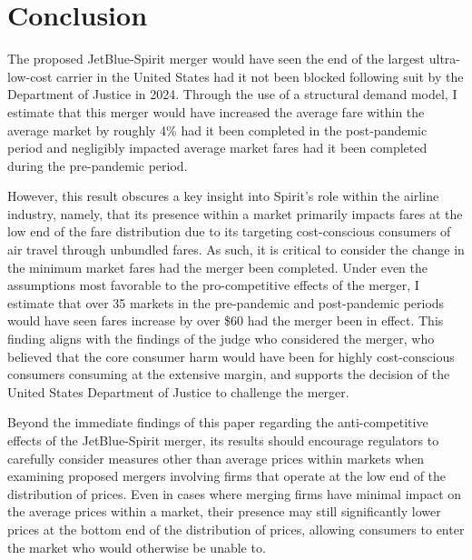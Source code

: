 \documentclass{article}
\begin{document}
    
	\section{Conclusion}
	\label{sec:Conclusion}
    The proposed JetBlue-Spirit merger would have seen the end of the largest ultra-low-cost carrier in the United States had it not been blocked following suit by the Department of Justice in 2024. Through the use of a structural demand model, I estimate that this merger would have increased the average fare within the average market by roughly 4\% had it been completed in the post-pandemic period and negligibly impacted average market fares had it been completed during the pre-pandemic period.

    However, this result obscures a key insight into Spirit's role within the airline industry, namely, that its presence within a market primarily impacts fares at the low end of the fare distribution due to its targeting cost-conscious consumers of air travel through unbundled fares. As such, it is critical to consider the change in the minimum market fares had the merger been completed. Under even the assumptions most favorable to the pro-competitive effects of the merger, I estimate that over 35 markets in the pre-pandemic and post-pandemic periods would have seen fares increase by over \$60 had the merger been in effect. This finding aligns with the findings of the judge who considered the merger, who believed that the core consumer harm would have been for highly cost-conscious consumers consuming at the extensive margin, and supports the decision of the United States Department of Justice to challenge the merger.

    Beyond the immediate findings of this paper regarding the anti-competitive effects of the JetBlue-Spirit merger, its results should encourage regulators to carefully consider measures other than average prices within markets when examining proposed mergers involving firms that operate at the low end of the distribution of prices. Even in cases where merging firms have minimal impact on the average prices within a market, their presence may still significantly lower prices at the bottom end of the distribution of prices, allowing consumers to enter the market who would otherwise be unable to. 
    
	
	\pagebreak 
	 
	
	\FloatBarrier
	
\end{document}
